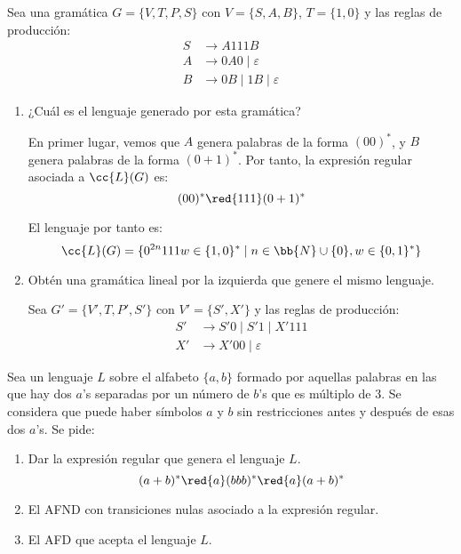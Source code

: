 \documentclass[12pt]{article}
\begin{document}
\begin{ejercicio}
    Sea una gramática $G=\{V,T,P,S\}$ con $V=\{S,A,B\}$, $T=\{1,0\}$ y las reglas de producción:
    \begin{align*}
        S & \rightarrow A111B \\
        A & \rightarrow 0A0\mid \varepsilon \\
        B & \rightarrow 0B \mid 1B\mid \varepsilon
    \end{align*}
    \begin{enumerate}
        \item ¿Cuál es el lenguaje generado por esta gramática?
        
        En primer lugar, vemos que $A$ genera palabras de la forma $(00)^*$, y $B$ genera palabras de la forma $(0+1)^*$. Por tanto, la expresión regular asociada a $\cc{L}(G)$ es:
        \begin{equation*}
            (00)^*\red{111}(0+1)^*
        \end{equation*}

        El lenguaje por tanto es:
        \begin{equation*}
            \cc{L}(G) = \{0^{2n}111w\in \{1,0\}^*\mid n\in \bb{N}\cup \{0\}, w\in\{0,1\}^*\}
        \end{equation*}

        \item Obtén una gramática lineal por la izquierda que genere el mismo lenguaje.
        
        Sea $G'= \{V',T,P',S'\}$ con $V'=\{S',X'\}$ y las reglas de producción:
        \begin{align*}
            S' & \rightarrow S'0 \mid S'1 \mid X'111 \\
            X' & \rightarrow X'00 \mid \varepsilon
        \end{align*}
    \end{enumerate}
\end{ejercicio}

\begin{ejercicio} \label{ej:2}
    Sea un lenguaje $L$ sobre el alfabeto $\{a,b\}$ formado por aquellas palabras en las que hay dos $a$'s separadas por un número de $b$'s que es múltiplo de $3$. Se considera que puede haber símbolos $a$ y $b$ sin restricciones antes y después de esas dos $a$'s. 
    Se pide:
    \begin{enumerate}
        \item Dar la expresión regular que genera el lenguaje $L$.
        \begin{equation*}
            (a+b)^*\red{a}(bbb)^*\red{a}(a+b)^*
        \end{equation*}

        \item El AFND con transiciones nulas asociado a la expresión regular.
        
        \item El AFD que acepta el lenguaje $L$.
    \end{enumerate}
\end{ejercicio}
\end{document}
